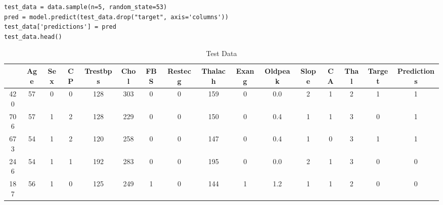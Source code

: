 \documentclass{article}
\begin{document}
\begin{LTR}
\begin{verbatim}
test_data = data.sample(n=5, random_state=53)
pred = model.predict(test_data.drop("target", axis='columns'))
test_data['predictions'] = pred
test_data.head()
\end{verbatim}
\end{LTR}

\begin{table}[H]
\centering
\begin{tabular}{cccccccccccccccc}
\toprule
 & Age & Sex & CP & Trestbps & Chol & FBS & Restecg & Thalach & Exang & Oldpeak & Slope & CA & Thal & Target & Predictions \\
\midrule
420 & 57 & 0 & 0 & 128 & 303 & 0 & 0 & 159 & 0 & 0.0 & 2 & 1 & 2 & 1 & 1 \\
706 & 57 & 1 & 2 & 128 & 229 & 0 & 0 & 150 & 0 & 0.4 & 1 & 1 & 3 & 0 & 1 \\
673 & 54 & 1 & 2 & 120 & 258 & 0 & 0 & 147 & 0 & 0.4 & 1 & 0 & 3 & 1 & 1 \\
246 & 54 & 1 & 1 & 192 & 283 & 0 & 0 & 195 & 0 & 0.0 & 2 & 1 & 3 & 0 & 0 \\
187 & 56 & 1 & 0 & 125 & 249 & 1 & 0 & 144 & 1 & 1.2 & 1 & 1 & 2 & 0 & 0 \\
\bottomrule
\end{tabular}
\caption{Test Data}
\label{tab:Q4 t}
\end{table}





\end{document}
